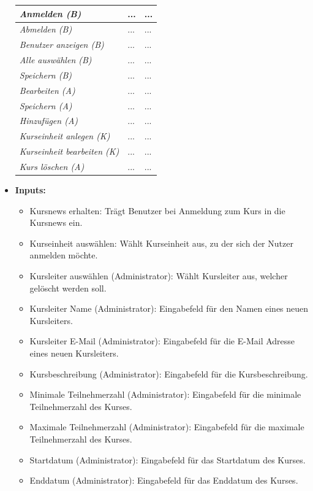 \begin{itemize}
\begin{center}
\begin{longtable}{|p{4cm} |p{6cm} | p{4cm}|}
					\textit{Anmelden (B)} & ... & ... \\ \hline
					\textit{Abmelden (B)} &  ... & ... \\ \hline
					\textit{Benutzer anzeigen (B)} & ... & ... \\ \hline
					\textit{Alle auswählen (B)} & ... & ... \\ \hline
					\textit{Speichern (B)} & ... & ... \\ \hline
					\textit{Bearbeiten (A)} & ... & ... \\ \hline
					\textit{Speichern (A)} & ... & ... \\ \hline
					\textit{Hinzufügen (A)} & ... & ... \\ \hline
					\textit{Kurseinheit anlegen (K)} & ... & ... \\ \hline
					\textit{Kurseinheit bearbeiten (K)} & ... & ... \\ \hline
					\textit{Kurs löschen (A)} & ... & ... \\ \hline
				\end{longtable}
			\end{center}
			\item \textbf{Inputs:}
			\begin{itemize}
				\item Kursnews erhalten: Trägt Benutzer bei Anmeldung zum Kurs in die Kursnews ein.
				\item Kurseinheit auswählen: Wählt Kurseinheit aus, zu der sich der Nutzer anmelden möchte.
				\item Kursleiter auswählen (Administrator): Wählt Kursleiter aus, welcher gelöscht werden soll.
				\item Kursleiter Name (Administrator): Eingabefeld für den Namen eines neuen Kursleiters.
				\item Kursleiter E-Mail (Administrator): Eingabefeld für die E-Mail Adresse eines neuen Kursleiters.
				\item Kursbeschreibung (Administrator): Eingabefeld für die Kursbeschreibung.
				\item Minimale Teilnehmerzahl (Administrator): Eingabefeld für die minimale Teilnehmerzahl des Kurses.
				\item Maximale Teilnehmerzahl (Administrator): Eingabefeld für die maximale Teilnehmerzahl des Kurses.
				\item Startdatum (Administrator): Eingabefeld für das Startdatum des Kurses.
				\item Enddatum (Administrator): Eingabefeld für das Enddatum des Kurses.
			\end{itemize}
				\begin{center}
					\begin{longtable}{|p{3cm} |p{4cm} | p{4cm}|p{3cm} |p{2cm}|}
						

\end{longtable}
\end{center}
\end{itemize}
